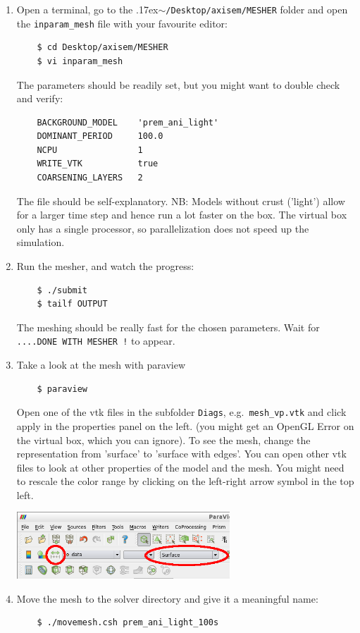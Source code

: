 \documentclass{article}
\newcommand{\ttilde}[0]{\raise.17ex\hbox{$\scriptstyle\sim$}}
\begin{document}
\begin{enumerate}
    \item Open a terminal, go to the \ttilde\verb|/Desktop/axisem/MESHER| folder and open
    the \verb|inparam_mesh| file with your favourite editor:
    \begin{verbatim}
    $ cd Desktop/axisem/MESHER
    $ vi inparam_mesh
    \end{verbatim}
    The parameters should be readily set, but you might want to double check and verify:
    \begin{verbatim}
    BACKGROUND_MODEL    'prem_ani_light'
    DOMINANT_PERIOD     100.0
    NCPU                1
    WRITE_VTK           true
    COARSENING_LAYERS   2
    \end{verbatim}
    The file should be self-explanatory. NB: Models without crust ('light') allow for a
    larger time step and hence run a lot faster on the box. The virtual box only has a
    single processor, so parallelization does not speed up the simulation.

    \item Run the mesher, and watch the progress:
    \begin{verbatim}
    $ ./submit
    $ tailf OUTPUT
    \end{verbatim}
    The meshing should be really fast for the chosen parameters. Wait for 
    \verb|....DONE WITH MESHER !| to appear.

    \item Take a look at the mesh with paraview
    \begin{verbatim}
    $ paraview
    \end{verbatim}
    Open one of the vtk files in the subfolder \verb|Diags|, e.g.\ \verb|mesh_vp.vtk|
    and click apply in the properties panel on the left. (you might get an OpenGL Error
    on the virtual box, which you can ignore). To see the mesh, change the representation
    from 'surface' to 'surface with edges'. You can open other vtk files to look at other
    properties of the model and the mesh. You might need to rescale the color range by
    clicking on the left-right arrow symbol in the top left.

    \begin{center}
    \includegraphics[width=80mm]{paraview.png}
    \end{center}
        
    \item Move the mesh to the solver directory and give it a meaningful name:
    \begin{verbatim}
    $ ./movemesh.csh prem_ani_light_100s
    \end{verbatim}

\end{enumerate}
\end{document}
